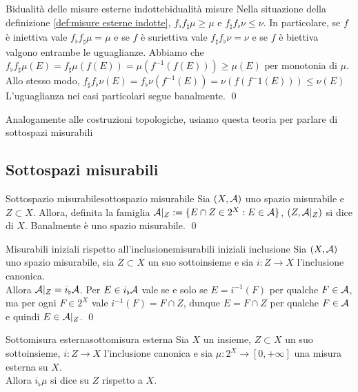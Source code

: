 \documentclass{article}
\renewcommand\A{\mc{A}}
\begin{document}
\begin{proposition}{Bidualità delle misure esterne indotte}{bidualità misure}
    Nella situazione della definizione \ref{def:misure esterne indotte}, $f_\flat f_\sharp\mu \ge \mu$ e $f_\sharp f_\flat\nu \le \nu$. In particolare, se $f$ è iniettiva vale $f_\flat f_\sharp\mu = \mu$ e se $f$ è suriettiva vale $f_\sharp f_\flat\nu = \nu$ e se $f$ è biettiva valgono entrambe le uguaglianze.
    \proof
    Abbiamo che $f_\flat f_\sharp\mu(E) = f_\sharp\mu(f(E)) = \mu(f^{-1}(f(E)))\ge \mu(E)$ per monotonia di $\mu$.\\
    Allo stesso modo, $f_\sharp f_\flat\nu(E) = f_\flat\nu(f^{-1}(E)) = \nu(f(f^-1(E))) \le \nu(E)$\\
    L'uguaglianza nei casi particolari segue banalmente.
    \qed
\end{proposition}

Analogamente alle costruzioni topologiche, usiamo questa teoria per parlare di sottospazi misurabili

\pagebreak
\subsection{Sottospazi misurabili}

\begin{definition}{Sottospazio misurabile}{sottospazio misurabile}
    Sia $(X,\A)$ uno spazio misurabile e $Z\subset X$. Allora, definita la famiglia $\A|_Z := \{E\cap Z \in 2^X : E\in \A\}$, $(Z, \A|_Z)$ si dice  di $X$.
    \proof 
    Banalmente è uno spazio misurabile.
    \qed
\end{definition}

\begin{proposition}{Misurabili iniziali rispetto all'inclusione}{misurabili iniziali inclusione}
    Sia $(X,\A)$ uno spazio misurabile, sia $Z\subset X$ un suo sottoinsieme e sia $i : Z \to X$ l'inclusione canonica.\\
    Allora $\A|_Z = i_\flat \A$.
    \proof
    Per $E \in i_\flat \A$ vale se e solo se $E = i^{-1}(F)$ per qualche $F \in \A$, ma per ogni $F \in 2^X$ vale $i^{-1}(F) = F \cap Z$, dunque $E = F\cap Z$ per qualche $F \in \A$ e quindi $E \in \A|_Z$.
    \qed
\end{proposition}

\begin{definition}{Sottomisura esterna}{sottomisura esterna}
    Sia $X$ un insieme, $Z\subset X$ un suo sottoinsieme, $i:Z\to X$ l'inclusione canonica e sia $\mu : 2^X \to [0,+\infty]$ una misura esterna su $X$.\\
    Allora $i_\flat \mu$ si dice  su $Z$ rispetto a $X$.
\end{definition}
\end{document}
